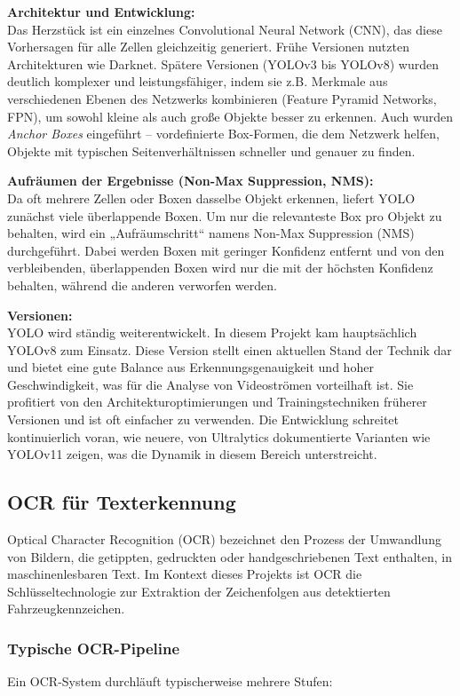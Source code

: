 \textbf{Architektur und Entwicklung:} \\
Das Herzstück ist ein einzelnes Convolutional Neural Network (CNN), das diese Vorhersagen für alle Zellen gleichzeitig generiert. Frühe Versionen nutzten Architekturen wie Darknet. Spätere Versionen (YOLOv3 bis YOLOv8) wurden deutlich komplexer und leistungsfähiger, indem sie z.B. Merkmale aus verschiedenen Ebenen des Netzwerks kombinieren (Feature Pyramid Networks, FPN), um sowohl kleine als auch große Objekte besser zu erkennen. Auch wurden \textit{Anchor Boxes} eingeführt – vordefinierte Box-Formen, die dem Netzwerk helfen, Objekte mit typischen Seitenverhältnissen schneller und genauer zu finden.

\textbf{Aufräumen der Ergebnisse (Non-Max Suppression, NMS):} \\
Da oft mehrere Zellen oder Boxen dasselbe Objekt erkennen, liefert YOLO zunächst viele überlappende Boxen. Um nur die relevanteste Box pro Objekt zu behalten, wird ein „Aufräumschritt“ namens Non-Max Suppression (NMS) durchgeführt. Dabei werden Boxen mit geringer Konfidenz entfernt und von den verbleibenden, überlappenden Boxen wird nur die mit der höchsten Konfidenz behalten, während die anderen verworfen werden.

\textbf{Versionen:} \\
YOLO wird ständig weiterentwickelt. In diesem Projekt kam hauptsächlich YOLOv8 zum Einsatz. Diese Version stellt einen aktuellen Stand der Technik dar und bietet eine gute Balance aus Erkennungsgenauigkeit und hoher Geschwindigkeit, was für die Analyse von Videoströmen vorteilhaft ist. Sie profitiert von den Architekturoptimierungen und Trainingstechniken früherer Versionen und ist oft einfacher zu verwenden. Die Entwicklung schreitet kontinuierlich voran, wie neuere, von Ultralytics dokumentierte Varianten wie YOLOv11 zeigen, was die Dynamik in diesem Bereich unterstreicht.

\subsection{OCR für Texterkennung}

Optical Character Recognition (OCR) bezeichnet den Prozess der Umwandlung von Bildern, die getippten, gedruckten oder handgeschriebenen Text enthalten, in maschinenlesbaren Text. Im Kontext dieses Projekts ist OCR die Schlüsseltechnologie zur Extraktion der Zeichenfolgen aus detektierten Fahrzeugkennzeichen.

\subsubsection{Typische OCR-Pipeline}
Ein OCR-System durchläuft typischerweise mehrere Stufen:

